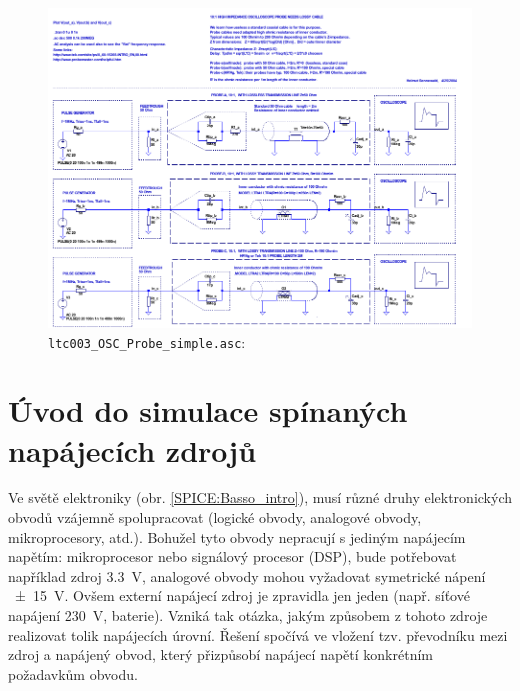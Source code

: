 {    \begin{figure}[ht!]
      \centering
      \includegraphics[width=1\linewidth]{../ltspice/ltc002_OSC_Probe.pdf}
      \caption{\texttt{ltc003\_OSC\_Probe\_simple.asc}: }
      \label{SPICE:fig_ltc002_OSC}
    \end{figure}
    
  \section{Úvod do simulace spínaných napájecích zdrojů}
    
    Ve světě elektroniky (obr. \ref{SPICE:Basso_intro}), musí různé druhy elektronických obvodů 
    vzájemně spolupracovat (logické obvody, analogové obvody, mikroprocesory, atd.). Bohužel tyto 
    obvody nepracují s jediným napájecím napětím: mikroprocesor nebo signálový procesor (DSP), bude 
    potřebovat například zdroj \SI{3.3}{\volt}, analogové obvody mohou vyžadovat symetrické nápení 
    \SI{\pm15}{\volt}. Ovšem externí napájecí zdroj je zpravidla jen jeden (např. síťové napájení 
    \SI{230}{\volt}, baterie). Vzniká tak otázka, jakým způsobem z tohoto zdroje realizovat tolik 
    napájecích úrovní. Řešení spočívá ve vložení tzv. převodníku mezi zdroj a napájený obvod, který 
    přizpůsobí napájecí napětí konkrétním požadavkům obvodu.
    
}
